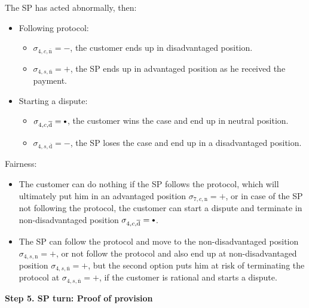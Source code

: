 \documentclass{ieeeaccess}
\newcommand\sbullet[1][.75]{\mathbin{\ThisStyle{\vcenter{\hbox{%
  \scalebox{#1}{$\SavedStyle\bullet$}}}}}%
}
\begin{document}
The SP has acted abnormally, then:

\begin{itemize}
\item
  Following protocol:

  \begin{itemize}
  
  \item
    \(\sigma_{4, c, \overline{\mathrm{n}}} = -\), the customer ends up in
    disadvantaged position.
  \item
    \(\sigma_{4, s, \overline{\mathrm{n}}} = +\), the SP ends up in
    advantaged position as he received the payment.
  \end{itemize}
\item
  Starting a dispute:

  \begin{itemize}
  
  \item
    \(\sigma_{4, c, \overline{\mathrm{d}}} = \sbullet\), the customer wins the
    case and end up in neutral position.
  \item
    \(\sigma_{4, s, \overline{\mathrm{d}}} = -\), the SP loses the case
    and end up in a disadvantaged position.
  \end{itemize}
\end{itemize}

Fairness:

\begin{itemize}

\item
  The customer can do nothing if the SP follows the protocol, which will
  ultimately put him in an advantaged position
  \(\sigma_{7, c, \mathrm{n}} = +\), or in case of the SP not following
  the protocol, the customer can start a dispute and terminate in
  non-disadvantaged position
  \(\sigma_{4, c, \overline{\mathrm{d}}} = \sbullet\).
\item
  The SP can follow the protocol and move to the non-disadvantaged
  position \(\sigma_{4, s, \mathrm{n}} = +\), or not follow the protocol
  and also end up at non-disadvantaged position
  \(\sigma_{4, s, \overline{\mathrm{n}}} = +\), but the second option
  puts him at risk of terminating the protocol at
  \(\sigma_{4, s, \overline{\mathrm{n}}} = +\), if the customer is
  rational and starts a dispute.
\end{itemize}

\noindent \textbf
{Step 5. SP turn: Proof of provision}\label{step-5-publication-of-proof-of-provision}
\end{document}
